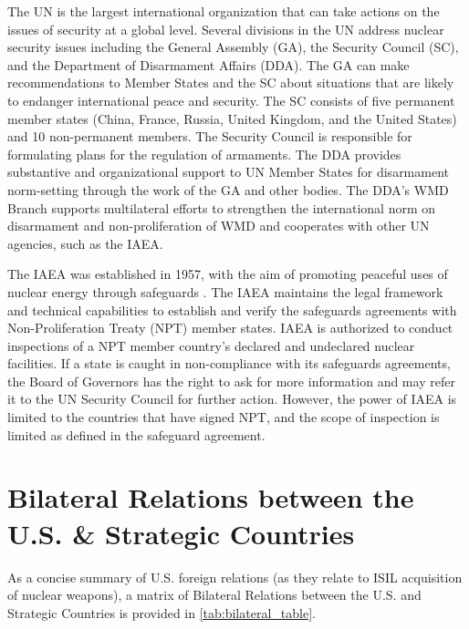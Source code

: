 \documentclass{report}
\begin{document}
The UN is the largest international organization that can take actions on the issues of security at a global level. Several divisions in the UN address nuclear security issues including the General Assembly (GA), the Security Council (SC), and the Department of Disarmament Affairs (DDA). The GA can make recommendations to Member States and the SC about situations that are likely to endanger international peace and security. The SC consists of five permanent member states (China, France, Russia, United Kingdom, and the United States) and 10 non-permanent members. The Security Council is responsible for formulating plans for the regulation of armaments. The DDA provides substantive and organizational support to UN Member States for disarmament norm-setting through the work of the GA and other bodies. The DDA's WMD Branch supports multilateral efforts to strengthen the international norm on disarmament and non-proliferation of WMD and cooperates with other UN agencies, such as the IAEA.

The IAEA was established in 1957, with the aim of promoting peaceful uses of nuclear energy through safeguards \cite{InternationalAtomicEnergyAgency}. The IAEA maintains the legal framework and technical capabilities to establish and verify the safeguards agreements with Non-Proliferation Treaty (NPT) member states. IAEA is authorized to conduct inspections of a NPT member country's declared and undeclared nuclear facilities. If a state is caught in non-compliance with its safeguards agreements, the Board of Governors has the right to ask for more information and may refer it to the UN Security Council for further action. However, the power of IAEA is limited to the countries that have signed NPT, and the scope of inspection is limited as defined in the safeguard agreement. 








\chapter[Appendix H: Bilateral Relations between the U.S. \& Strategic Countries]{Bilateral Relations between the U.S. \&  Strategic Countries} \label{app:relations_table}

As a concise summary of U.S. foreign relations (as they relate to ISIL acquisition of nuclear weapons), a matrix of Bilateral Relations between the U.S. and Strategic Countries is provided in \autoref{tab:bilateral_table}.
\end{document}
